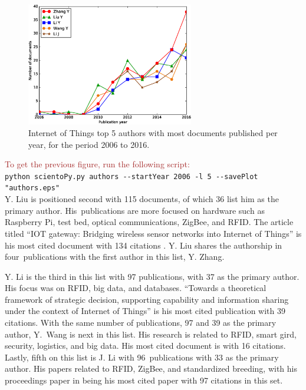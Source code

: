 \documentclass[symmetry,article,accept,moreauthors,pdftex10pt,a4paper]{mdpi}
\newcommand{\figuresWidth}{0.65\textwidth}
\begin{document}
\begin{figure}[H]
	\centering
	\includegraphics[width=\figuresWidth]{./graphs/figure3.eps}
	\caption{Internet of Things top 5 authors with most documents published per year, for the period 2006 to 2016.}
	\label{fig_authors}
\end{figure}  

\noindent
\textcolor{brown}{To get the previous figure, run the following script:}\\
\hspace*{0.5cm}\verb|python scientoPy.py authors --startYear 2006 -l 5 --savePlot "authors.eps"|\\


Y. Liu is positioned second with 115 documents, of which 36 list him as the primary author. His~publications are more focused on hardware such as Raspberry Pi, test bed, optical communications, ZigBee, and RFID. The article titled ``IOT gateway: Bridging wireless sensor networks into Internet of Things'' is his most cited document with 134 citations \cite{Zhu2010347}. Y. Liu shares the authorship in four~publications with the first author in this list, Y. Zhang.

Y. Li is the third in this list with 97 publications, with 37 as the primary author. His  focus was on RFID, big data, and databases. ``Towards a theoretical framework of strategic decision, supporting capability and information sharing under the context of Internet of Things'' \cite{Li2012} is his most cited publication with 39 citations. With the same number of publications, 97 and 39 as the primary author, Y.~Wang is next in this list. His research is related to RFID, smart gird, security, logistics, and big data. His most cited document is \cite{6737280} with 16 citations. Lastly, fifth on this list is J. Li with 96~publications with 33 as the primary author. His papers related to RFID, ZigBee, and standardized breeding, with his proceedings paper in \cite{Su20111028} being his most cited paper with 97 citations in this set.  %
\end{document}
